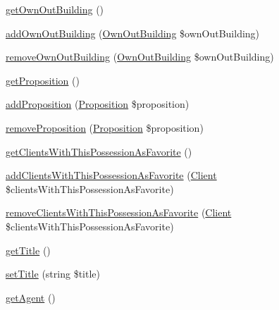 \begin{DoxyCompactItemize}
\item 
\mbox{\hyperlink{class_app_1_1_entity_1_1_possession_aaf190d3aab26b67e86cfa0d759a0a9e6}{get\+Own\+Out\+Building}} ()
\item 
\mbox{\hyperlink{class_app_1_1_entity_1_1_possession_a494be730fc915817fdc2643ccae26715}{add\+Own\+Out\+Building}} (\mbox{\hyperlink{class_app_1_1_entity_1_1_own_out_building}{Own\+Out\+Building}} \$own\+Out\+Building)
\item 
\mbox{\hyperlink{class_app_1_1_entity_1_1_possession_a86b76f753808f1339ddca94a754da3d2}{remove\+Own\+Out\+Building}} (\mbox{\hyperlink{class_app_1_1_entity_1_1_own_out_building}{Own\+Out\+Building}} \$own\+Out\+Building)
\item 
\mbox{\hyperlink{class_app_1_1_entity_1_1_possession_aa37187d64f069bb4138a898dc861dcc9}{get\+Proposition}} ()
\item 
\mbox{\hyperlink{class_app_1_1_entity_1_1_possession_a0fb37c482d114bb0ddea86771b806277}{add\+Proposition}} (\mbox{\hyperlink{class_app_1_1_entity_1_1_proposition}{Proposition}} \$proposition)
\item 
\mbox{\hyperlink{class_app_1_1_entity_1_1_possession_a58c62b937fc2658f35588927927601f5}{remove\+Proposition}} (\mbox{\hyperlink{class_app_1_1_entity_1_1_proposition}{Proposition}} \$proposition)
\item 
\mbox{\hyperlink{class_app_1_1_entity_1_1_possession_ab65280ef4246514cc54ed37b2314aaf1}{get\+Clients\+With\+This\+Possession\+As\+Favorite}} ()
\item 
\mbox{\hyperlink{class_app_1_1_entity_1_1_possession_ad925b126642a522cf7c80df736818fb0}{add\+Clients\+With\+This\+Possession\+As\+Favorite}} (\mbox{\hyperlink{class_app_1_1_entity_1_1_client}{Client}} \$clients\+With\+This\+Possession\+As\+Favorite)
\item 
\mbox{\hyperlink{class_app_1_1_entity_1_1_possession_a701fd9450a4fee4a931d09d68a8a3fcc}{remove\+Clients\+With\+This\+Possession\+As\+Favorite}} (\mbox{\hyperlink{class_app_1_1_entity_1_1_client}{Client}} \$clients\+With\+This\+Possession\+As\+Favorite)
\item 
\mbox{\hyperlink{class_app_1_1_entity_1_1_possession_a95e859a4588a39a1824b717378a84c29}{get\+Title}} ()
\item 
\mbox{\hyperlink{class_app_1_1_entity_1_1_possession_a754ef3032cc3ffb25ad2d1a13720fc29}{set\+Title}} (string \$title)
\item 
\mbox{\hyperlink{class_app_1_1_entity_1_1_possession_a14f9546bbf5895db0fe37673bab21850}{get\+Agent}} ()
\item 

\end{DoxyCompactItemize}
